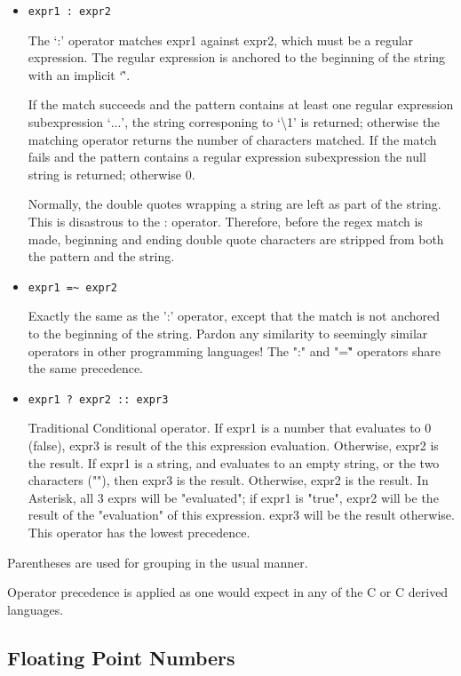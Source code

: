 \begin{itemize}
  \item \verb!expr1 : expr2!

       The `:' operator matches expr1 against expr2, which must be a
       regular expression.  The regular expression is anchored to the
       beginning of  the string with an implicit `\^'.

       If the match succeeds and the pattern contains at least one regular
       expression subexpression `\(...\)', the string corresponing
       to `\textbackslash1' is returned; otherwise the matching operator
       returns the number of characters matched.  If the match fails and
       the pattern contains a regular expression subexpression the null
       string is returned; otherwise 0.

       Normally, the double quotes wrapping a string are left as part
       of the string. This is disastrous to the : operator. Therefore,
       before the regex match is made, beginning and ending double quote
       characters are stripped from both the pattern and the string.

   \item \verb!expr1 =~ expr2!

       Exactly the same as the ':' operator, except that the match is
       not anchored to the beginning of the string. Pardon any similarity
       to seemingly similar operators in other programming languages!
       The ":" and "=\~" operators share the same precedence.

   \item \verb!expr1 ? expr2 :: expr3!

       Traditional Conditional operator. If expr1 is a number
       that evaluates to 0 (false), expr3 is result of the this
       expression evaluation.  Otherwise, expr2 is the result.
       If expr1 is a string, and evaluates to an empty string,
       or the two characters (""), then expr3 is the
       result. Otherwise, expr2 is the result.  In Asterisk, all
       3 exprs will be "evaluated"; if expr1 is "true", expr2
       will be the result of the "evaluation" of this
       expression.  expr3 will be the result otherwise. This
       operator has the lowest precedence.
\end{itemize}

Parentheses are used for grouping in the usual manner.

Operator precedence is applied as one would expect in any of the C
or C derived languages.

\subsection{Floating Point Numbers}

